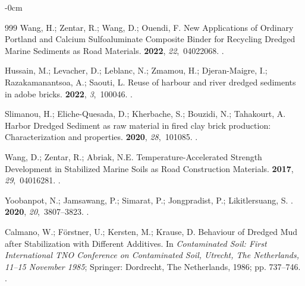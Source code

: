 \documentclass[sustainability,article,accept,pdftex,moreauthors]{Definitions/mdpi}
\begin{document}
{{\begin{adjustwidth}{-\extralength}{0cm}
\begin{thebibliography}{999}
Wang, H.; Zentar, R.; Wang, D.; Ouendi, F.
\newblock New Applications of Ordinary Portland and Calcium Sulfoaluminate
  Composite Binder for Recycling Dredged Marine Sediments as Road Materials.
 {\bf 2022}, {\em
  22},~04022068.
.

Hussain, M.; Levacher, D.; Leblanc, N.; Zmamou, H.; Djeran-Maigre, I.;
  Razakamanantsoa, A.; Saouti, L.
\newblock Reuse of harbour and river dredged sediments in adobe bricks.
 {\bf 2022}, {\em 3},~100046.
.

Slimanou, H.; Eliche-Quesada, D.; Kherbache, S.; Bouzidi, N.; Tahakourt, A.
\newblock Harbor Dredged Sediment as raw material in fired clay brick
  production: Characterization and properties.
 {\bf 2020}, {\em 28},~101085.
.

Wang, D.; Zentar, R.; Abriak, N.E.
\newblock Temperature-Accelerated Strength Development in Stabilized Marine
  Soils as Road Construction Materials.
 {\bf 2017}, {\em
  29},~04016281.
.

Yoobanpot, N.; Jamsawang, P.; Simarat, P.; Jongpradist, P.; Likitlersuang, S.
.
 {\bf 2020}, {\em
  20},~3807--3823.
.

Calmano, W.; F{\"o}rstner, U.; Kersten, M.; Krause, D. Behaviour of Dredged
  Mud after Stabilization with Different Additives.\linebreak 
\newblock In {\em Contaminated Soil: First International TNO Conference on
  Contaminated Soil, Utrecht, The Netherlands, 11--15 November 1985}; Springer:
  Dordrecht, The Netherlands, 1986; pp. 737--746.
.


\end{thebibliography}
\end{adjustwidth}}}
\end{document}

